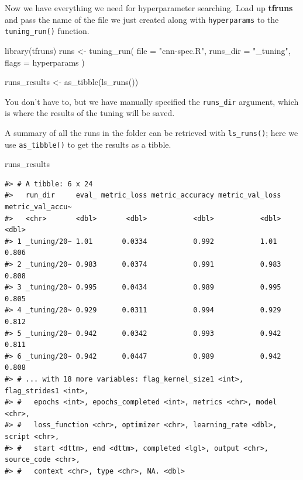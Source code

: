 \documentclass[
]{krantz}
\makeatletter
\newenvironment{Shaded}{\begin{snugshade}}{\end{snugshade}}
\newcommand{\AttributeTok}[1]{\textcolor[rgb]{0.77,0.63,0.00}{#1}}
\newcommand{\FunctionTok}[1]{\textcolor[rgb]{0.00,0.00,0.00}{#1}}
\newcommand{\NormalTok}[1]{#1}
\newcommand{\OtherTok}[1]{\textcolor[rgb]{0.56,0.35,0.01}{#1}}
\newcommand{\StringTok}[1]{\textcolor[rgb]{0.31,0.60,0.02}{#1}}
\newenvironment{kframe}{%
\medskip{}
\setlength{\fboxsep}{.8em}
 \def\at@end@of@kframe{}%
 \ifinner\ifhmode%
  \def\at@end@of@kframe{\end{minipage}}%
  \begin{minipage}{\columnwidth}%
 \fi\fi%
 \def\FrameCommand##1{\hskip\@totalleftmargin \hskip-\fboxsep
 \colorbox{shadecolor}{##1}\hskip-\fboxsep
     \hskip-\linewidth \hskip-\@totalleftmargin \hskip\columnwidth}%
 \MakeFramed {\advance\hsize-\width
   \@totalleftmargin\z@ \linewidth\hsize
   \@setminipage}}%
 {\par\unskip\endMakeFramed%
 \at@end@of@kframe}
\renewenvironment{Shaded}{\begin{kframe}}{\end{kframe}}
\makeatother
\begin{document}
Now we have everything we need for hyperparameter searching. Load up \textbf{tfruns} and pass the name of the file we just created along with \texttt{hyperparams} to the \texttt{tuning\_run()} function.

\begin{Shaded}
\begin{Highlighting}[]
\FunctionTok{library}\NormalTok{(tfruns)}
\NormalTok{runs }\OtherTok{\textless{}{-}} \FunctionTok{tuning\_run}\NormalTok{(}
  \AttributeTok{file =} \StringTok{"cnn{-}spec.R"}\NormalTok{,}
  \AttributeTok{runs\_dir =} \StringTok{"\_tuning"}\NormalTok{,}
  \AttributeTok{flags =}\NormalTok{ hyperparams}
\NormalTok{)}

\NormalTok{runs\_results }\OtherTok{\textless{}{-}} \FunctionTok{as\_tibble}\NormalTok{(}\FunctionTok{ls\_runs}\NormalTok{())}
\end{Highlighting}
\end{Shaded}

You don't have to, but we have manually specified the \texttt{runs\_dir} argument, which is where the results of the tuning will be saved.

A summary of all the runs in the folder can be retrieved with \texttt{ls\_runs()}; here we use \texttt{as\_tibble()} to get the results as a tibble.

\begin{Shaded}
\begin{Highlighting}[]
\NormalTok{runs\_results}
\end{Highlighting}
\end{Shaded}

\begin{verbatim}
#> # A tibble: 6 x 24
#>   run_dir     eval_ metric_loss metric_accuracy metric_val_loss metric_val_accu~
#>   <chr>       <dbl>       <dbl>           <dbl>           <dbl>            <dbl>
#> 1 _tuning/20~ 1.01       0.0334           0.992           1.01             0.806
#> 2 _tuning/20~ 0.983      0.0374           0.991           0.983            0.808
#> 3 _tuning/20~ 0.995      0.0434           0.989           0.995            0.805
#> 4 _tuning/20~ 0.929      0.0311           0.994           0.929            0.812
#> 5 _tuning/20~ 0.942      0.0342           0.993           0.942            0.811
#> 6 _tuning/20~ 0.942      0.0447           0.989           0.942            0.808
#> # ... with 18 more variables: flag_kernel_size1 <int>, flag_strides1 <int>,
#> #   epochs <int>, epochs_completed <int>, metrics <chr>, model <chr>,
#> #   loss_function <chr>, optimizer <chr>, learning_rate <dbl>, script <chr>,
#> #   start <dttm>, end <dttm>, completed <lgl>, output <chr>, source_code <chr>,
#> #   context <chr>, type <chr>, NA. <dbl>
\end{verbatim}
\end{document}
